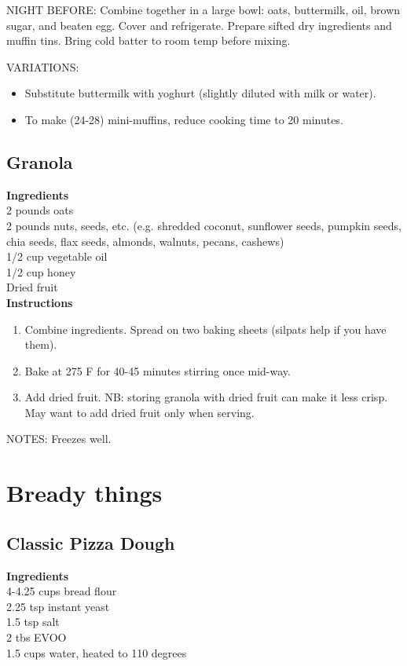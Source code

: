 \documentclass{article}
\numberwithin{figure}{section}
\numberwithin{equation}{section}
\begin{document}
NIGHT BEFORE: Combine together in a large bowl: oats, buttermilk, oil, brown sugar, and beaten egg.  Cover and refrigerate.  Prepare sifted dry ingredients and muffin tins.  Bring cold batter to room temp before mixing.

VARIATIONS: 
\begin{itemize}
\item Substitute buttermilk with yoghurt (slightly diluted with milk or water).
\item To make (24-28) mini-muffins, reduce cooking time to 20 minutes.
\end{itemize}

\pagebreak
\subsection{Granola}
{\bf Ingredients}\\
2 pounds oats\\
2 pounds nuts, seeds, etc. (e.g. shredded coconut, sunflower seeds, pumpkin seeds, chia seeds, flax seeds, almonds, walnuts, pecans, cashews)\\
1/2 cup vegetable oil\\
1/2 cup honey\\
Dried fruit\\

{\bf Instructions}
\begin{enumerate}
\item Combine ingredients. Spread on two baking sheets (silpats help if you have them).
\item Bake at 275 F for 40-45 minutes stirring once mid-way.
\item Add dried fruit. NB: storing granola with dried fruit can make it less crisp. May want to add dried fruit only when serving.
\end{enumerate}

NOTES: Freezes well.


\pagebreak
\section{Bready things}

\pagebreak
\subsection{Classic Pizza Dough}
{\bf Ingredients}\\
4-4.25 cups bread flour\\
2.25 tsp instant yeast\\
1.5 tsp salt\\
2 tbs EVOO\\
1.5 cups water, heated to 110 degrees\\
\end{document}
